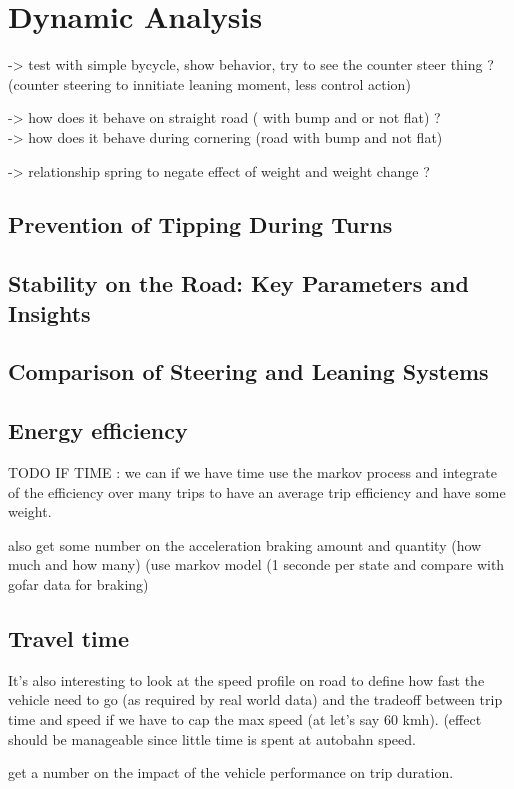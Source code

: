 \section{Dynamic Analysis}

-> test with simple bycycle, show behavior, try to see the counter steer thing ?\\ (counter steering to innitiate leaning moment, less control action)

-> how does it behave on straight road ( with bump and or not flat) ?\\

-> how does it behave during cornering (road with bump and not flat)

-> relationship spring to negate effect of weight and weight change ?\\

\subsection{Prevention of Tipping During Turns}

\subsection{Stability on the Road: Key Parameters and Insights}

\subsection{Comparison of Steering and Leaning Systems}

\subsection{Energy efficiency}
TODO IF TIME : 
we can if we have time use the markov process and integrate of the efficiency over many trips to have an average trip efficiency and have some weight.

also get some number on the acceleration braking amount and quantity (how much and how many) (use markov model (1 seconde per state and compare with gofar data for braking)

\subsection{Travel time}
It's also interesting to look at the speed profile on road to define how fast the vehicle need to go (as required by real world data) and the tradeoff between trip time and speed if we have to cap the max speed (at let's say 60 kmh). (effect should be manageable since little time is spent at autobahn speed.

get a number on the impact of the vehicle performance on trip duration.

